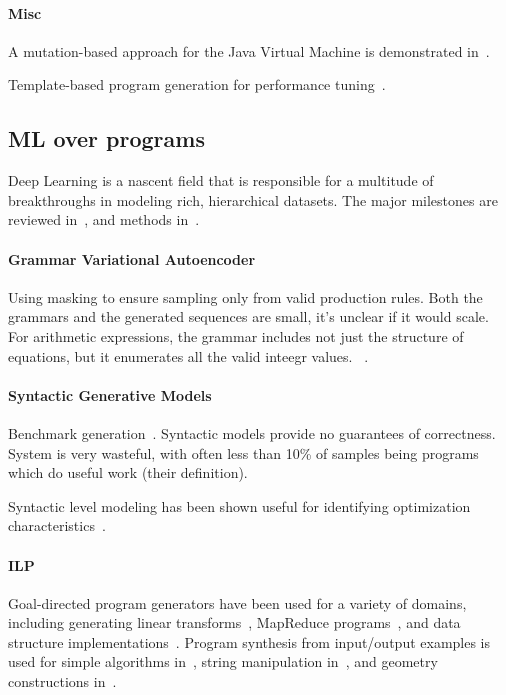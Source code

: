 \paragraph{Misc} A mutation-based approach for the Java Virtual Machine is demonstrated in~\cite{Chena}.

Template-based program generation for performance tuning~\cite{Han2017}.

\subsection{ML over programs} 

Deep Learning is a nascent field that is responsible for a multitude of breakthroughs in modeling rich, hierarchical datasets. The major milestones are reviewed in~\cite{Wang2017}, and methods in~\cite{Schmidhuber2014}.

\paragraph{Grammar Variational Autoencoder} Using masking to ensure sampling only from valid production rules. Both the grammars and the generated sequences are small, it's unclear if it would scale. For arithmetic expressions, the grammar includes not just the structure of equations, but it enumerates all the valid inteegr values. ~\cite{Kusner2017}.

\paragraph{Syntactic Generative Models} Benchmark generation~\cite{Cummins2017a}. Syntactic models provide no guarantees of correctness. System is very wasteful, with often less than 10\% of samples being programs which do useful work (their definition).

Syntactic level modeling has been shown useful for identifying optimization characteristics~\cite{Cummins2017b}.

\paragraph{ILP} Goal-directed program generators have been used for a variety of domains, including generating linear transforms~\cite{Voronenko2009}, MapReduce programs~\cite{Smith}, and data structure implementations~\cite{Loncaric2016}. Program synthesis from input/output examples is used for simple algorithms in~\cite{Zaremba2015a}, string manipulation in~\cite{Gulwani2011}, and geometry constructions in~\cite{Gulwani2012}.


